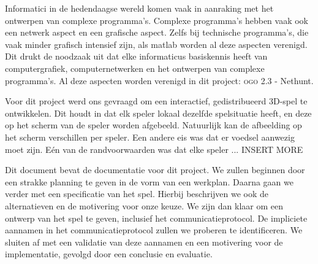 Informatici in de hedendaagse wereld komen vaak in aanraking met het ontwerpen van complexe programma's. Complexe programma's hebben vaak ook een netwerk aspect en een grafische aspect. Zelfs bij technische programma's, die vaak minder grafisch intensief zijn, als matlab worden al deze aspecten verenigd. Dit drukt de noodzaak uit dat elke informaticus basiskennis heeft van computergrafiek, computernetwerken en het ontwerpen van complexe programma's. Al deze aspecten worden verenigd in dit project: \textsc{ogo} 2.3 - Nethunt. 

Voor dit project werd ons gevraagd om een interactief, gedistribueerd 3D-spel te ontwikkelen. Dit houdt in dat elk speler lokaal dezelfde spelsituatie heeft, en deze op het scherm van de speler worden afgebeeld. Natuurlijk kan de afbeelding op het scherm verschillen per speler. Een andere eis was dat er voedsel aanwezig moet zijn. E\'en van de randvoorwaarden was dat elke speler ... INSERT MORE

Dit document bevat de documentatie voor dit project. We zullen beginnen door een strakke planning te geven in de vorm van een werkplan. Daarna gaan we verder met een specificatie van het spel. Hierbij beschrijven we ook de alternatieven en de motivering voor onze keuze. We zijn dan klaar om een ontwerp van het spel te geven, inclusief het communicatieprotocol. De impliciete aannamen in het communicatieprotocol zullen we proberen te identificeren. We sluiten af met een validatie van deze aannamen en een motivering voor de implementatie, gevolgd door een conclusie en evaluatie.